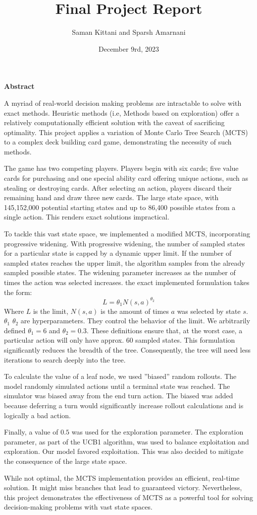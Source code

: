 \documentclass{article}
\title{Final Project Report}
\author{Saman Kittani and Sparsh Amarnani}
\date{December 9rd, 2023}
\begin{document}
	\maketitle
	\newpage
	\textbf{Abstract}
  
  A myriad of real-world decision making problems are intractable to solve with exact methods. Heuristic methods (i.e, Methods based on exploration) offer a relatively computationally efficient solution with the caveat of sacrificing optimality. This project applies a variation of Monte Carlo Tree Search (MCTS) to a complex deck building card game, demonstrating the necessity of such methods.
 
  The game has two competing players. Players begin with six cards; five value cards for purchasing and one special ability card offering unique actions, such as stealing or destroying cards. After selecting an action, players discard their remaining hand and draw three new cards. The large state space, with 145,152,000 potential starting states and up to 86,400 possible states from a single action. This renders exact solutions impractical.
  
  To tackle this vast state space, we implemented a modified MCTS, incorporating progressive widening. With progressive widening, the number of sampled states for a particular state is capped by a dynamic upper limit. If the number of sampled states reaches the upper limit, the algorithm samples from the already sampled possible states. The widening parameter increases as the number of times the action was selected increases. the exact implemented formulation takes the form:
  \begin{equation}
    L = \theta_1 N(s,a)^{\theta_2}
  \end{equation}
  Where $L$ is the limit, $N(s,a)$ is the amount of times $a$ was selected by state $s$. $\theta_1$ $\theta_2$ are hyperparameters. They control the behavior of the limit. We arbitrarily defined $\theta_1 = 6$ and $\theta_2 = 0.3$. 
  These definitions ensure that, at the worst case, a particular action will only have approx. 60 sampled states. This formulation significantly reduces the breadth of the tree. Consequently, the tree will need less iterations to search deeply into the tree.

  To calculate the value of a leaf node, we used ''biased'' random rollouts. The model randomly simulated actions until a terminal state was reached. The simulator was biased away from the end turn action. The biased was added because deferring a turn would significantly increase rollout calculations and is logically a bad action. 
  
  Finally, a value of $0.5$ was used for the exploration parameter. The exploration parameter, as part of the UCB1 algorithm, was used to balance exploitation and exploration. Our model favored exploitation. This was also decided to mitigate the consequence of the large state space. 

  While not optimal, the MCTS implementation provides an efficient, real-time solution. It might miss branches that lead to guaranteed victory. Nevertheless, this project demonstrates the effectiveness of MCTS as a powerful tool for solving decision-making problems with vast state spaces.
\end{document}
